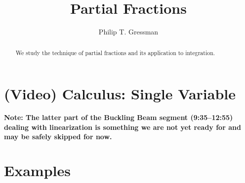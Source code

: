 \documentclass{ximera}
\title{Partial Fractions}
\author{Philip T. Gressman}
\begin{document}
\begin{abstract}
We study the technique of partial fractions and its application to integration.
\end{abstract}
\maketitle

\section*{(Video) Calculus: Single Variable}

\textbf{Note: The latter part of the Buckling Beam segment (9:35--12:55) dealing with linearization is something we are not yet ready for and may be safely skipped for now.}

\section*{Examples}

\begin{example}

\end{example}

\begin{example}

\end{example}
\end{document}
